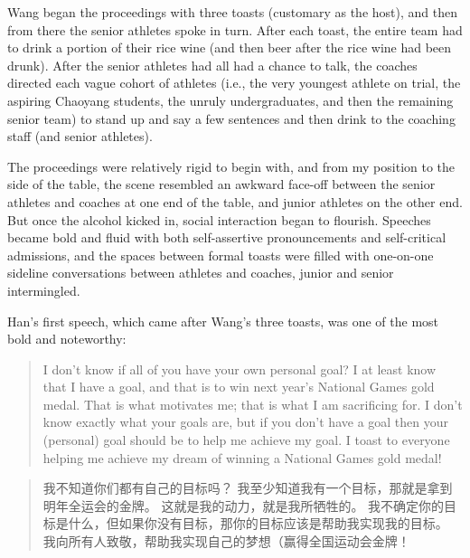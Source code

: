 \begin{CJK}{UTF8}{gbsn}
Wang began the proceedings with three toasts (customary as the host), and then from there the senior athletes spoke in turn.  After each toast, the entire team had to drink a portion of their rice wine (and then beer after the rice wine had been drunk).  After the senior athletes had all had a chance to talk, the coaches directed each vague cohort of athletes (i.e., the very youngest athlete on trial, the aspiring Chaoyang students, the unruly undergraduates, and then the remaining senior team) to stand up and say a few sentences and then drink to the coaching staff (and senior athletes).

The proceedings were relatively rigid to begin with, and from my position to the side of the table, the scene resembled an awkward face-off between the senior athletes and coaches at one end of the table, and junior athletes on the other end.  But once the alcohol kicked in, social interaction began to flourish. Speeches became bold and fluid with both self-assertive pronouncements and self-critical admissions, and the spaces between formal toasts were filled with one-on-one sideline conversations between athletes and coaches, junior and senior intermingled.

Han's first speech, which came after Wang's three toasts, was one of the most bold and noteworthy:

  \begin{quotation}
    I don’t know if all of you have your own personal goal?  I at least know that I have a goal, and that is to win next year’s National Games gold medal.  That is what motivates me; that is what I am sacrificing for.  I don’t know exactly what your goals are, but if you don't have a goal then your (personal) goal should be to help me achieve my goal.  I toast to everyone helping me achieve my dream of winning a National Games gold medal!
  \end{quotation}

  \begin{quotation}
      我不知道你们都有自己的目标吗？ 我至少知道我有一个目标，那就是拿到明年全运会的金牌。 这就是我的动力，就是我所牺牲的。 我不确定你的目标是什么，但如果你没有目标，那你的目标应该是帮助我实现我的目标。 我向所有人致敬，帮助我实现自己的梦想（赢得全国运动会金牌！
  \end{quotation}


\end{CJK}
